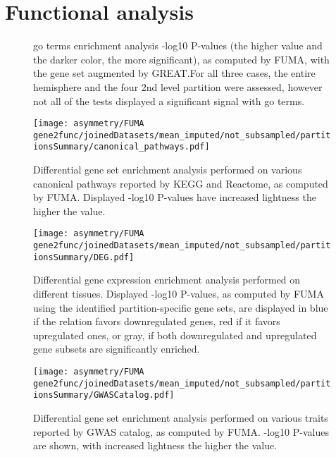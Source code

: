 \chapter{Functional analysis}
\begin{figure}[H]
	\centering
	\quad
	\quad
	\caption[GO terms enrichment analysis]{\Ac{go} terms enrichment analysis -log10 P-values (the higher value and the darker color, the more significant), as computed by FUMA, with the gene set augmented by GREAT.For all three cases, the entire hemisphere and the four 2nd level partition were assessed, however not all of the tests displayed a significant signal with \ac{go} terms.}
	\label{fig:go}
\end{figure}

\begin{figure}[H]
	\centering
	\texttt{[image: asymmetry/FUMA gene2func/joinedDatasets/mean\_imputed/not\_subsampled/partitionsSummary/canonical\_pathways.pdf]}
	
	\caption[Canonical pathways gene set enrichment analysis]{Differential gene set enrichment analysis performed on various canonical pathways reported by KEGG and Reactome, as computed by FUMA. Displayed -log10 P-values have increased lightness the higher the value.}
	\label{fig:can_pathways}
\end{figure}
\begin{figure}[H]
	\centering
	\texttt{[image: asymmetry/FUMA gene2func/joinedDatasets/mean\_imputed/not\_subsampled/partitionsSummary/DEG.pdf]}
	
	\caption[Differential gene expression enrichment analysis]{Differential gene expression enrichment analysis performed on different tissues. Displayed -log10 P-values, as computed by FUMA using the identified partition-specific gene sets, are displayed in blue if the relation favors downregulated genes, red if it favors upregulated ones, or gray, if both downregulated and upregulated gene subsets are significantly enriched.}
	\label{fig:de_genes}
\end{figure}
\begin{figure}[H]
	\centering
	\texttt{[image: asymmetry/FUMA gene2func/joinedDatasets/mean\_imputed/not\_subsampled/partitionsSummary/GWASCatalog.pdf]}
	
	\caption[GWAS Catalog gene set enrichment analysis]{Differential gene set enrichment analysis performed on various traits reported by GWAS catalog, as computed by FUMA. -log10 P-values are shown, with increased lightness the higher the value.}
	\label{fig:gw_catalog}
\end{figure}
